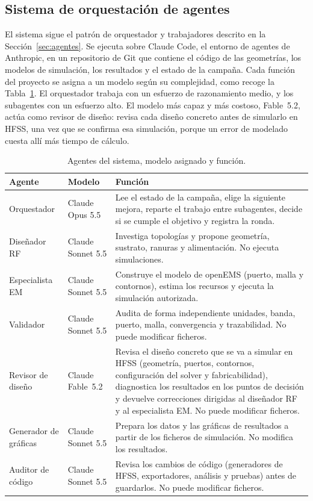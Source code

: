 \documentclass[11pt,a4paper]{article}
\begin{document}
\subsection{Sistema de orquestación de agentes}\label{sec:agentes_arquitectura}
El sistema sigue el patrón de orquestador y trabajadores descrito en la
Sección~\ref{sec:agentes}. Se ejecuta sobre Claude Code, el entorno de agentes de Anthropic, en
un repositorio de Git que contiene el código de las geometrías, los modelos de simulación, los
resultados y el estado de la campaña. Cada función del proyecto se asigna a un modelo según su
complejidad, como recoge la Tabla~\ref{tab:agentes}. El orquestador trabaja con un esfuerzo de
razonamiento medio, y los subagentes con un esfuerzo alto. El modelo más capaz y más costoso,
Fable~5.2, actúa como revisor de diseño: revisa cada diseño concreto antes de simularlo en HFSS,
una vez que se confirma esa simulación, porque un error de modelado cuesta allí más tiempo de
cálculo.

\begin{table}[H]
    \centering
    \caption{Agentes del sistema, modelo asignado y función.}
    \label{tab:agentes}
    \begin{tabularx}{\textwidth}{l l X}
        \toprule
        Agente & Modelo & Función \\
        \midrule
        Orquestador & Claude Opus 5.5 & Lee el estado de la campaña, elige la siguiente mejora,
        reparte el trabajo entre subagentes, decide si se cumple el objetivo y registra la ronda. \\
        Diseñador RF & Claude Sonnet 5.5 & Investiga topologías y propone geometría, sustrato,
        ranuras y alimentación. No ejecuta simulaciones. \\
        Especialista EM & Claude Sonnet 5.5 & Construye el modelo de openEMS (puerto, malla y
        contornos), estima los recursos y ejecuta la simulación autorizada. \\
        Validador & Claude Sonnet 5.5 & Audita de forma independiente unidades, banda, puerto,
        malla, convergencia y trazabilidad. No puede modificar ficheros. \\
        Revisor de diseño & Claude Fable~5.2 & Revisa el diseño concreto que se va a simular en
        HFSS (geometría, puertos, contornos, configuración del solver y fabricabilidad), diagnostica
        los resultados en los puntos de decisión y devuelve correcciones dirigidas al diseñador RF
        y al especialista EM. No puede modificar ficheros. \\
        Generador de gráficas & Claude Sonnet 5.5 & Prepara los datos y las gráficas de resultados a
        partir de los ficheros de simulación. No modifica los resultados. \\
        Auditor de código & Claude Sonnet 5.5 & Revisa los cambios de código (generadores de
        HFSS, exportadores, análisis y pruebas) antes de guardarlos. No puede modificar ficheros. \\
        \bottomrule
    \end{tabularx}
\end{table}
\end{document}

